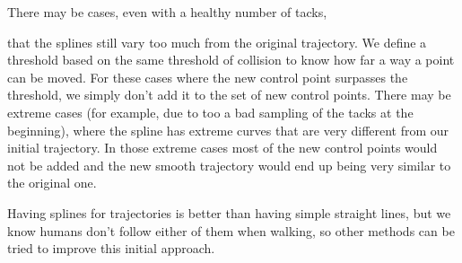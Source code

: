 
There may be cases, even with a healthy number of tacks,


that the splines still vary too much from the original trajectory. We define a threshold based on the same threshold of collision to know how far a way a point can be moved. For these cases where the new control point surpasses the threshold, we simply don't add it to the set of new control points.  There may be extreme cases (for example, due to too a bad sampling of the tacks at the beginning), where the spline has extreme curves that are very different from our initial trajectory. In those extreme cases most of the new control points would not be added and the new smooth trajectory would end up being very similar to the original one.

Having splines for trajectories is better than having simple straight lines, but we know humans don't  follow either of them when walking,  so other methods can be tried to improve this initial approach.



